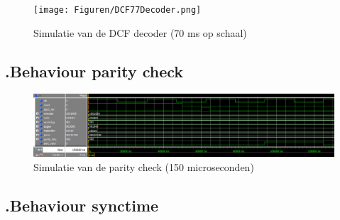 \begin{figure}[ht!]
\texttt{[image: Figuren/DCF77Decoder.png]}
\caption{Simulatie van de DCF decoder (70 ms op schaal)}
\end{figure}
\subsection*{\label{fig: parity_beh}\thesubsection.\quad Behaviour parity check}
\begin{figure}[ht!]
\includegraphics[width=\textwidth,height=\textheight,keepaspectratio]{Figuren/DCF77/Parity_check.png}
\caption{Simulatie van de parity check (150 microseconden)}
\end{figure}
\subsection*{\label{fig: synctime_beh}\thesubsection.\quad Behaviour synctime}

